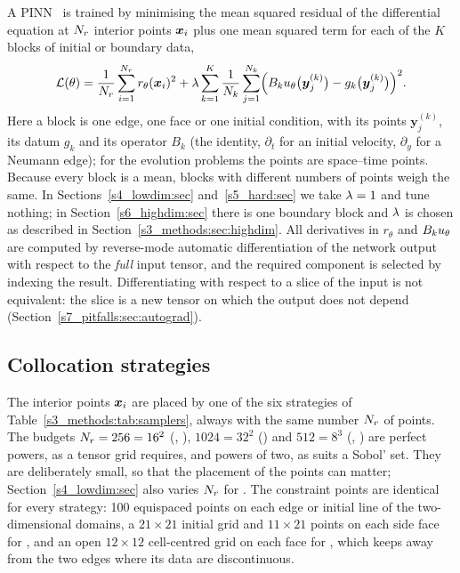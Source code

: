 A PINN~\citep{raissi2019} is trained by minimising the mean squared residual of the
differential equation at $N_{r}$ interior points $\boldsymbol{x}_i$ plus one mean squared term for each
of the $K$ blocks of initial or boundary data,
\begin{equation}\label{s3_methods:eq:pinn}
\mathcal{L}(\theta)=\frac{1}{N_{r}}\sum_{i=1}^{N_{r}} r_\theta(\boldsymbol{x}_i)^2
+\lambda\sum_{k=1}^{K}\frac{1}{N_k}\sum_{j=1}^{N_k}
\Bigl(B_ku_{\theta}\bigl(\boldsymbol{y}^{(k)}_j\bigr)-g_k\bigl(\boldsymbol{y}^{(k)}_j\bigr)\Bigr)^2 .
\end{equation}
Here a block is one edge, one face or one initial condition, with its points
$\boldsymbol{y}^{(k)}_j$, its datum $g_k$ and its operator $B_k$ (the identity,
$\partial_t$ for an initial velocity, $\partial_y$ for a Neumann edge); for the evolution
problems the points are space--time points. Because every block is a mean, blocks with
different numbers of points weigh the same. In Sections~\ref{s4_lowdim:sec}
and~\ref{s5_hard:sec} we take $\lambda=1$ and tune nothing; in Section~\ref{s6_highdim:sec}
there is one boundary block and $\lambda$ is chosen as described in
Section~\ref{s3_methods:sec:highdim}.
All derivatives in $r_\theta$ and $B_ku_{\theta}$ are computed by reverse-mode automatic
differentiation of the network output with respect to the \emph{full} input tensor, and
the required component is selected by indexing the result. Differentiating with respect
to a slice of the input is not equivalent: the slice is a new tensor on which the output
does not depend (Section~\ref{s7_pitfalls:sec:autograd}).

\subsection{Collocation strategies}\label{s3_methods:sec:colloc}

The interior points $\boldsymbol{x}_i$ are placed by one of the six strategies of
Table~\ref{s3_methods:tab:samplers}, always with the same number $N_{r}$ of points. The
budgets $N_{r}=256=16^2$ (\PH, \PLtwo), $1024=32^2$ (\PWone) and $512=8^3$ (\PWtwo,
\PLthree) are perfect powers, as a tensor grid requires, and powers of two, as suits a
Sobol' set. They are deliberately small, so that the placement of the points can matter;
Section~\ref{s4_lowdim:sec} also varies $N_{r}$ for \PH. The constraint points are identical
for every strategy: 100 equispaced points on each edge or initial line of the two-dimensional
domains, a $21\times21$ initial grid and $11\times21$ points on each side face for \PWtwo,
and an open $12\times12$ cell-centred grid on each face for \PLthree, which keeps away
from the two edges where its data are discontinuous.

